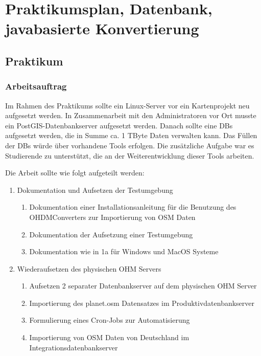 \newpage \setheadsepline{.5px} \setfootsepline{.5px}
\setcounter{page}{1}
\ihead{} \chead{} \ohead{\headmark}
\ifoot{} \cfoot{\pagemark} \ofoot{}
\part{Praktikumsplan, Datenbank, javabasierte Konvertierung}
\chapter{Praktikum}
\section{Arbeitsauftrag}
Im Rahmen des Praktikums sollte ein Linux-Server vor ein Kartenprojekt neu
aufgesetzt werden. In Zusammenarbeit mit den Administratoren vor Ort musste ein
PostGIS-Datenbankserver aufgesetzt werden. Danach sollte eine DBs aufgesetzt werden, die in Summe ca. 1
TByte Daten verwalten kann. Das Füllen der DBs würde über vorhandene Tools erfolgen. Die zusätzliche Aufgabe war es Studierende zu unterstützt, die an der Weiterentwicklung dieser Tools arbeiten.

Die Arbeit sollte wie folgt aufgeteilt werden:
\begin{enumerate}
	\item Dokumentation und Aufsetzen der Testumgebung
	\begin{enumerate}
		\item Dokumentation einer Installationsanleitung für die Benutzung des \newline OHDMConverters zur Importierung von \ac{OSM} Daten
		\item Dokumentation der Aufsetzung einer Testumgebung
		\item Dokumentation wie in 1a für Windows und MacOS Systeme
	\end{enumerate}
	\item Wiederaufsetzen des physischen OHM Servers
	\begin{enumerate}
		\item Aufsetzen 2 separater Datenbankserver auf dem physischen OHM Server
		\item Importierung des planet.osm Datensatzes im Produktivdatenbankserver
		\item Formulierung eines Cron-Jobs zur Automatisierung
		\item Importierung von \ac{OSM} Daten von Deutschland im Integrationsdatenbankserver
	\end{enumerate}
\end{enumerate}

